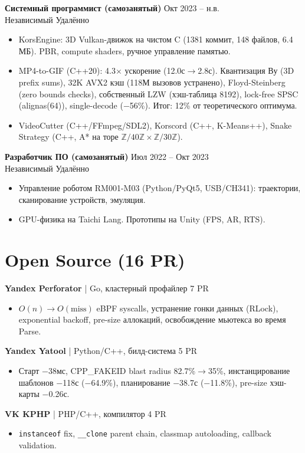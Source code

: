 \documentclass[10pt, a4paper]{article}
\newcommand{\entry}[4]{{\textbf{#1}} \hfill {\small\color{graytext}#2}\\{\small #3 \hfill #4}\vspace{2pt}}
\newcommand{\projentry}[3]{{\textbf{#1}} {\small\color{graytext}| #2} \hfill {\small #3}\\}
\begin{document}
\entry{Системный программист (самозанятый)}{Окт 2023 -- н.в.}{Независимый}{Удалённо}
\begin{itemize}
\item KorsEngine: 3D Vulkan-движок на чистом C (1381 коммит, 148 файлов, 6.4 МБ). PBR, compute shaders, ручное управление памятью.
\item MP4-to-GIF (C++20): 4.3$\times$ ускорение (12.0с$\to$2.8с). Квантизация Ву (3D prefix sums), 32K AVX2 кэш (118М вызовов устранено), Floyd-Steinberg (zero bounds checks), собственный LZW (хэш-таблица 8192), lock-free SPSC (alignas(64)), single-decode ($-$56\%). Итог: 12\% от теоретического оптимума.
\item VideoCutter (C++/FFmpeg/SDL2), Korscord (C++, K-Means++), Snake Strategy (C++, A* на торе $\mathbb{Z}/40\mathbb{Z} \times \mathbb{Z}/30\mathbb{Z}$).
\end{itemize}

\entry{Разработчик ПО (самозанятый)}{Июл 2022 -- Окт 2023}{Независимый}{Удалённо}
\begin{itemize}
\item Управление роботом RM001-M03 (Python/PyQt5, USB/CH341): траектории, сканирование устройств, эмуляция.
\item GPU-физика на Taichi Lang. Прототипы на Unity (FPS, AR, RTS).
\end{itemize}

\vspace{-2pt}

\section{Open Source (16 PR)}

\projentry{Yandex Perforator}{Go, кластерный профайлер}{7 PR}
\begin{itemize}
\item $O(n){\to}O(\text{miss})$ eBPF syscalls, устранение гонки данных (RLock), exponential backoff, pre-size аллокаций, освобождение мьютекса во время Parse.
\end{itemize}

\projentry{Yandex Yatool}{Python/C++, билд-система}{5 PR}
\begin{itemize}
\item Старт $-$38мс, CPP\_FAKEID blast radius 82.7\%$\to$35\%, инстанцирование шаблонов $-$118с ($-$64.9\%), планирование $-$38.7с ($-$11.8\%), pre-size хэш-карты $-$0.26с.
\end{itemize}

\projentry{VK KPHP}{PHP/C++, компилятор}{4 PR}
\begin{itemize}
\item \texttt{instanceof} fix, \texttt{\_\_clone} parent chain, classmap autoloading, callback validation.
\end{itemize}
\end{document}
